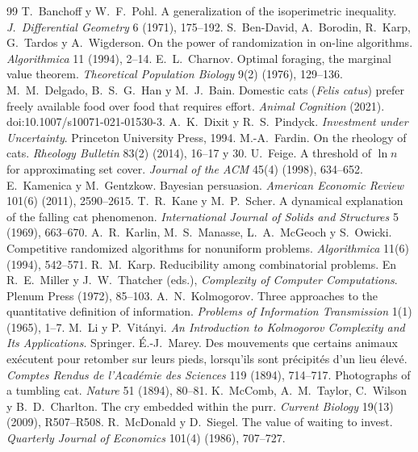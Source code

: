 \documentclass[11pt,a4paper]{article}
\theoremstyle{plain}
\theoremstyle{definition}
\theoremstyle{remark}
\numberwithin{equation}{section}
\begin{document}
\begin{thebibliography}{99}
\small
{} T.~Banchoff y W.~F.~Pohl. A generalization of the isoperimetric inequality. \emph{J.\ Differential Geometry} 6 (1971), 175--192.
 S.~Ben-David, A.~Borodin, R.~Karp, G.~Tardos y A.~Wigderson. On the power of randomization in on-line algorithms. \emph{Algorithmica} 11 (1994), 2--14.
 E.~L.~Charnov. Optimal foraging, the marginal value theorem. \emph{Theoretical Population Biology} 9(2) (1976), 129--136.
 M.~M.~Delgado, B.~S.~G.~Han y M.~J.~Bain. Domestic cats (\emph{Felis catus}) prefer freely available food over food that requires effort. \emph{Animal Cognition} (2021). doi:10.1007/s10071-021-01530-3.
 A.~K.~Dixit y R.~S.~Pindyck. \emph{Investment under Uncertainty}. Princeton University Press, 1994.
 M.-A.~Fardin. On the rheology of cats. \emph{Rheology Bulletin} 83(2) (2014), 16--17 y 30.
 U.~Feige. A threshold of $\ln n$ for approximating set cover. \emph{Journal of the ACM} 45(4) (1998), 634--652.
 E.~Kamenica y M.~Gentzkow. Bayesian persuasion. \emph{American Economic Review} 101(6) (2011), 2590--2615.
 T.~R.~Kane y M.~P.~Scher. A dynamical explanation of the falling cat phenomenon. \emph{International Journal of Solids and Structures} 5 (1969), 663--670.
 A.~R.~Karlin, M.~S.~Manasse, L.~A.~McGeoch y S.~Owicki. Competitive randomized algorithms for nonuniform problems. \emph{Algorithmica} 11(6) (1994), 542--571.
 R.~M.~Karp. Reducibility among combinatorial problems. En R.~E.~Miller y J.~W.~Thatcher (eds.), \emph{Complexity of Computer Computations}. Plenum Press (1972), 85--103.
 A.~N.~Kolmogorov. Three approaches to the quantitative definition of information. \emph{Problems of Information Transmission} 1(1) (1965), 1--7.
 M.~Li y P.~Vitányi. \emph{An Introduction to Kolmogorov Complexity and Its Applications}. Springer.
 É.-J.~Marey. Des mouvements que certains animaux exécutent pour retomber sur leurs pieds, lorsqu'ils sont précipités d'un lieu élevé. \emph{Comptes Rendus de l'Académie des Sciences} 119 (1894), 714--717.
 Photographs of a tumbling cat. \emph{Nature} 51 (1894), 80--81.
 K.~McComb, A.~M.~Taylor, C.~Wilson y B.~D.~Charlton. The cry embedded within the purr. \emph{Current Biology} 19(13) (2009), R507--R508.
 R.~McDonald y D.~Siegel. The value of waiting to invest. \emph{Quarterly Journal of Economics} 101(4) (1986), 707--727.

\end{thebibliography}
\end{document}
